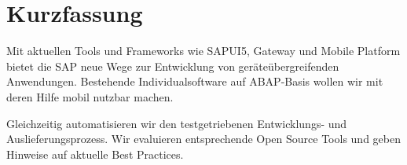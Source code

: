 
\chapter{Kurzfassung}

Mit aktuellen Tools und Frameworks wie SAPUI5, Gateway und Mobile Platform bietet die
SAP neue Wege zur Entwicklung von geräteübergreifenden Anwendungen. 
Bestehende Individualsoftware auf ABAP-Basis wollen wir mit deren Hilfe mobil nutzbar machen.

Gleichzeitig automatisieren wir den testgetriebenen Entwicklungs- und
Auslieferungsprozess. Wir evaluieren entsprechende Open Source Tools und geben Hinweise auf aktuelle Best Practices. 
